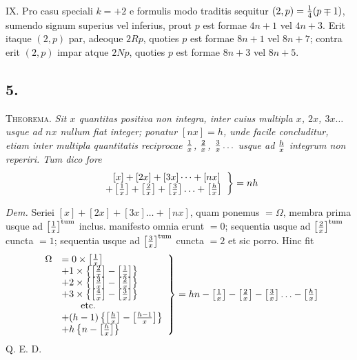 \documentclass[twoside,12pt]{memoir}
\let\oldfrac\frac
\def\frac#1#2{\mathchoice{\tfrac{#1}{#2}}{\oldfrac{#1}{#2}}{\genfrac{}{}{}{2}{#1}{#2\mathstrut}}{\genfrac{}{}{}{3}{#1}{#2\mathstrut}}}
\begin{document}
IX. Pro casu speciali \(k=+2\) e formulis modo traditis sequitur \((2, p)=\frac{1}{4}(p \mp 1)\), sumendo signum superius vel inferius, prout \(p\) est formae \(4 n+1\) vel \(4 n+3\). Erit itaque \((2, p)\) par, adeoque \(2 {R} p\), quoties \(p\) est formae \(8 n+1\) vel \(8 n+7\); contra erit \((2, p)\) impar atque \(2 N p\), quoties \(p\) est formae \(8 n+3\) vel \(8 n+5\).\pagebreak%

\subsection*{5.}
 
\textsc{Theorema.} \textit{Sit \(x\) quantitas positiva non integra, inter cuius multipla \(x\), \(2 x\), \(3 x \ldots\) usque ad \(n x\) nullum fiat integer; ponatur \([n x]=h\), unde facile concluditur, etiam inter multipla quantitatis reciprocae \(\frac{1}{x}\), \(\frac{2}{x}\), \(\frac{3}{x} \ldots\) usque ad \(\frac{h}{x}\) integrum non reperiri. Tum dico fore}
\[\left.\begin{array}{l} 
\phantom{+}[x]+[2 x]+[3 x]\dots+[n x] \\
+\left[\frac{1}{x}\right]+\left[\frac{2}{x}\right]+\left[\frac{3}{x}\right] \ldots+\left[\frac{h}{x}\right]
\end{array}\right\}=n h\]
 
\textit{Dem.} Seriei \([x]+[2 x]+[3 x] \ldots+[n x]\), quam ponemus \(=\Omega\), membra prima usque ad \(\left[\frac{1}{x}\right]^{\text{tum}}\) inclus. manifesto omnia erunt \(=0\); sequentia usque ad \(\left[\frac{2}{x}\right]^{\text{tum}}\)
cuncta \(=1\); sequentia usque ad \(\left[\frac{3}{x}\right]^{\text{tum}}\) cuncta \(=2\) et sic porro. Hinc fit
\[\left.\begin{array}{rl}
{\Omega}&= 0 \times\left[\frac{1}{x}\right] \\
& +1 \times\left\{\left[\frac{2}{x}\right]-\left[\frac{1}{x}\right]\right\} \\
& +2 \times\left\{\left[\frac{3}{x}\right]-\left[\frac{2}{x}\right]\right\} \\
& +3 \times\left\{\left[\frac{4}{x}\right]-\left[\frac{3}{x}\right]\right\} \\
&\qquad \text{etc.} \\
& +(h-1)\left\{\left[\frac{h}{x}\right]-\left[\frac{h-1}{x}\right]\right\} \\
& +h\left\{n-\left[\frac{h}{x}\right]\right\}
\end{array}\right\}=h n-\left[\frac{1}{x}\right]-\left[\frac{2}{x}\right]-\left[\frac{3}{x}\right] \ldots-\left[\frac{h}{x}\right]\]
Q. E. D.
\end{document}
